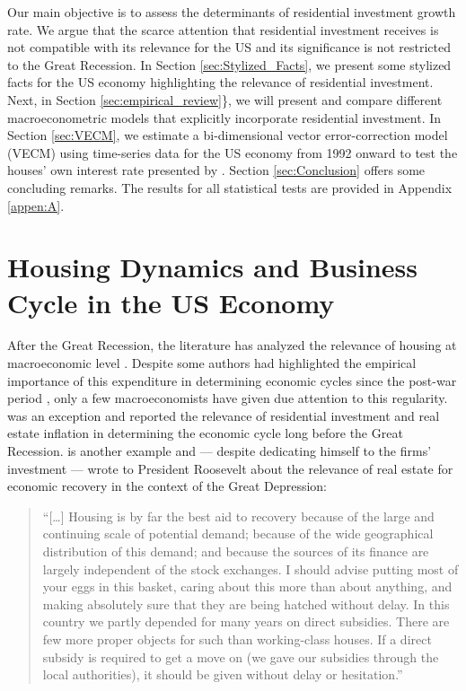 \documentclass[11pt]{article}
\begin{document}
Our main objective is to assess the determinants of residential investment growth rate.
We argue that the scarce attention that residential investment receives is not compatible with its relevance for the US and its significance is not restricted to the Great Recession.
In Section \ref{sec:Stylized_Facts}, we present some stylized facts for the US economy highlighting the relevance of residential investment.
Next, in Section \ref{sec:empirical_review}\}, we will present and compare different macroeconometric models that explicitly incorporate residential investment.
In Section \ref{sec:VECM}, we estimate a bi-dimensional vector error-correction model (VECM) using time-series data for the US economy from 1992 onward to test the houses' own interest rate presented by \textcite{teixeira_crescimento_2015}. 
Section \ref{sec:Conclusion} offers some concluding remarks.
The results for all statistical tests are provided in Appendix \ref{appen:A}.



\section{Housing Dynamics and Business Cycle in the US Economy}
\label{sec:org239d45e}
\label{sec:Stylized_Facts}
After the Great Recession, the literature has analyzed the relevance of housing at macroeconomic level \cites{leamer_housing_2015}{teixeira_crescimento_2015}{fiebiger_semi-autonomous_2018}.
Despite some authors had highlighted the empirical importance of this expenditure in determining economic cycles since the post-war period \cites{grebler_capital_1956}{green_follow_1997}{leamer_housing_2007}, only a few macroeconomists have given due attention to this regularity.
\textcite{duesenberry_investment_1958} was an exception and reported the relevance of residential investment and real estate inflation in
determining the economic cycle long before the Great Recession.
\textcite{keynes_collected_1978} is another example and --- despite dedicating himself to the firms' investment --- wrote to President Roosevelt about the relevance of real estate for economic recovery in the context of the Great Depression:

\begin{quote}
    ``[\ldots{}] Housing is by far the best aid to recovery because of the large and continuing scale
of potential demand; because of the wide geographical distribution of this demand; and
because the sources of its finance are largely independent of the stock exchanges. I should
advise putting most of your eggs in this basket, caring about this more than about anything,
and making absolutely sure that they are being hatched without delay. In this country we
partly depended for many years on direct subsidies. There are few more proper objects for
such than working-class houses. If a direct subsidy is required to get a move on (we gave
our subsidies through the local authorities), it should be given without delay or hesitation.''
\cite[p.~436]{keynes_collected_1978}
\end{quote}
\end{document}
